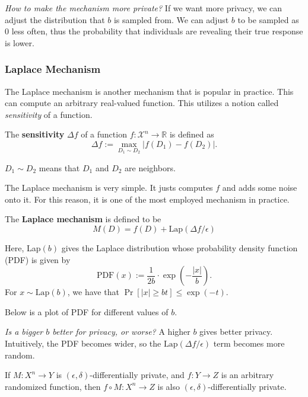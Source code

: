\textit{How to make the mechanism more private?} If we want more privacy, we can adjust the distribution that $b$ is sampled from. We can adjust $b$ to be sampled as $0$ less often, thus the probability that individuals are revealing their true response is lower.

\subsubsection{Laplace Mechanism}

The Laplace mechanism is another mechanism that is popular in practice. This can compute an arbitrary real-valued function. This utilizes a notion called \textit{sensitivity} of a function.

\begin{definition}
    The \textbf{sensitivity} $\Delta f$ of a function $f: \mathcal{X}^n \to \mathbb{R}$ is defined as
    $$\Delta f := \max_{D_1 \sim D_2}|f(D_1) - f(D_2)|.$$

    $D_1\sim D_2$ means that $D_1$ and $D_2$ are neighbors.
\end{definition}

The Laplace mechanism is very simple. It justs computes $f$ and adds some noise onto it. For this reason, it is one of the most employed mechanism in practice.

\begin{definition}
    The \textbf{Laplace mechanism} is defined to be
    $$M(D) = f(D) + \text{Lap}(\Delta f / \epsilon)$$
\end{definition}

Here, Lap$(b)$ gives the Laplace distribution whose probability density function (PDF) is given by 
$$\text{PDF}(x) := \frac{1}{2b} \cdot \exp\left(-\frac{|x|}{b}\right).$$
For $x \sim \text{Lap}(b)$, we have that $\Pr [|x| \geq bt] \leq \exp (-t)$.

Below is a plot of PDF for different values of $b$.

\begin{center}
    \def\svgwidth{0.5\linewidth}
    
\end{center}

\textit{Is a bigger $b$ better for privacy, or worse?} A higher $b$ gives better privacy. Intuitively, the PDF becomes wider, so the $\text{Lap}(\Delta f / \epsilon)$ term becomes more random.

\begin{theorem}
    If $M: X^n \to Y$ is $(\epsilon, \delta)$-differentially private, and $f:Y\to Z$ is an arbitrary randomized function, then $f\circ M : X^n \to Z$ is also $(\epsilon, \delta)$-differentially private.
\end{theorem}

